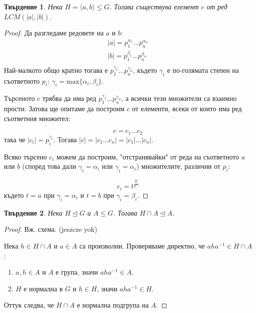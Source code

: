 \documentclass{article}
\newtheorem{prop}{Твърдение}
\theoremstyle{definition}
\newcommand{\ord}[1]{|#1|}
\begin{document}
\begin{prop}
    Нека $H = \langle a , b \rangle \le G$. Тогава съществува елемент $c$ от ред $LCM(\ord a, \ord b)$.
\end{prop}
\begin{proof}
    Да разгледаме редовете на $a$ и $b$:
    \begin{align*}
        \ord a = p_1^{\alpha_1} \dots p_n^{\alpha_n}\\
        \ord b = p_1^{\beta_1} \dots p_n^{\beta_n}\\
    \end{align*}
    Най-малкото общо кратно тогава е $p_1^{\gamma_1} \dots p_n^{\gamma_n}$, където $\gamma_i$ е по-голямата степен на съответното $p_i$: $\gamma_i = \text{max}\{\alpha_i, \beta_i\}$.

    Търсеното $c$ трябва да има ред $p_1^{\gamma_1} \dots p_n^{\gamma_n}$, а всички тези множители са взаимно прости. Затова ще опитаме да построим $c$ от елементи, всеки от които има ред съответния множител:

    $$c = c_1 \dots c_2$$
    така че $\ord {c_i} = p_i^{\gamma_i}$. Тогава $\ord c = \ord{c_1\dots c_n} = \ord{c_1}\dots\ord{c_n}$.

    Всяко търсено $c_i$ можем да построим, "отстранявайки" от реда на съответното $a$ или $b$ (според това дали $\gamma_i = \alpha_i$ или $\gamma_i = \alpha_i$) множителите, различни от $p_i$:

    $$c_i = t^{\frac{\ord t}{p^{\gamma_i}}}$$
    където $t = a$ при $\gamma_i = \alpha_i$ и $t = b$ при $\gamma_i = \beta_i$.
\end{proof}

\begin{prop}
    Нека $H \trianglelefteq G$ и $A \le G$. Тогава $H \cap A \trianglelefteq A$.
\end{prop}
\begin{proof}
    Вж. схема. (jeszcze yok)

    Нека $h \in H\cap A$ и $a \in A$ са произволни. Проверяваме директно, че $aha^{-1} \in H\cap A$:
    \begin{enumerate}
        \item $a, h \in A$ и $A$ е група, значи $aha^{-1} \in A$.
        \item $H$ е нормална в $G$ и $h \in H$, значи $aha^{-1} \in H$.
    \end{enumerate}

    Оттук следва, че $H \cap A$ е нормална подгрупа на $A$.
\end{proof}
\end{document}
